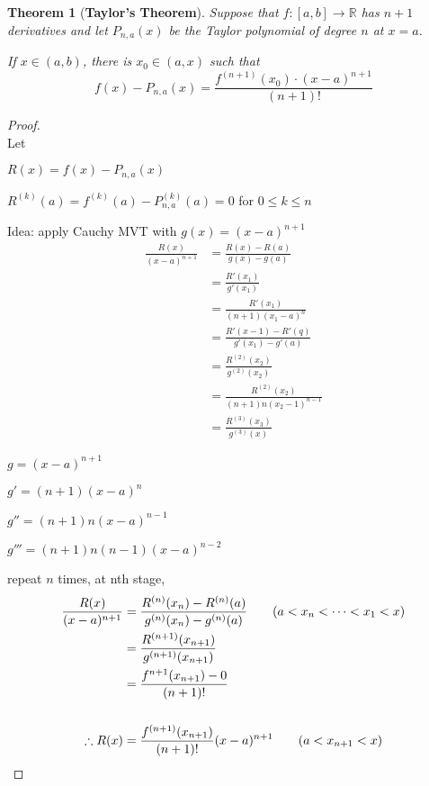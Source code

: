 \documentclass[12pt]{article}
\theoremstyle{plain}
\newtheorem{theorem}{Theorem}[section]
\begin{document}
		\begin{theorem}[\textbf{Taylor's Theorem}]
			Suppose that $f:[a,b] \to \mathbb{R}$ has $n+1$ derivatives and 
			let $P_{n,a}(x)$ be the Taylor polynomial of degree $n$ at $x=a$.

			If $x\in(a,b)$, there is $x_0 \in (a,x)$ such that 
			\[
				f(x)-P_{n,a}(x) = \frac{f^{(n+1)}(x_0)\cdot (x-a)^{n+1}}{(n+1)!}
			\]
		\end{theorem}
		\begin{proof}
			$ $\\
			Let 
		\begin{description}
				\item $R(x) = f(x) - P_{n,a}(x)$
				\item $R^{(k)}(a) = f^{(k)}(a) - P^{(k)}_{n,a}(a) = 0$ 
						for $0\leq k\leq n$
			\end{description}

			Idea: apply Cauchy MVT with $g(x) = (x-a)^{n+1}$
			\begin{align*}
			\frac{R(x)}{(x-a)^{n+1}} 
				&=\frac{R(x)-R(a)}{g(x)-g(a)} \\
				&=\frac{R'(x_1)}{g'(x_1)} \tag{$a<x_1<x$}\\
				&=\frac{R'(x_1)}{(n+1)(x_1-a)^n}\\
				&=\frac{R'(x-1)-R'(q)}{g'(x_1)-g'(a)}\\
				&=\frac{R^{(2)}(x_2)}{g^{(2)}(x_2)} \tag{$a<x_2<x_1<x$}\\
				&=\frac{R^{(2)}(x_2)}{(n+1)n(x_2-1)^{n-1}}\\
				&=\frac{R^{(3)}(x_3)}{g^{(3)}(x)} \tag{$a<x_3<x_2<x_1<x$}
			\end{align*}
		\begin{description}
			\item $g=(x-a)^{n+1}$
			\item $g'=(n+1)(x-a)^n$
			\item $g''= (n+1)n(x-a)^{n-1}$
			\item $g'''=(n+1)n(n-1)(x-a)^{n-2}$
		\end{description}

		repeat $n$ times, at nth stage, 
		\begin{align*}
			\frac{R(x)}{(x-a)^{n+1}}
			&=\frac{R^{(n)}(x_n)-R^{(n)}(a)}
				{g^{(n)}(x_n)-g^{(n)}(a)} \tag{$a<x_n<\cdots<x_1<x$}\\
			&=\frac{R^{(n+1)}(x_{n+1})}{g^{(n+1)}(x_{n+1})}\\
			&=\frac{f^{n+1}(x_{n+1})-0}{(n+1)!}\\\\
			\therefore R(x) &= \frac{f^{(n+1)}(x_{n+1})}{(n+1)!}(x-a)^{n+1} 
			\tag{$a<x_{n+1}<x$}
		\end{align*}
	\end{proof}
\end{document}
